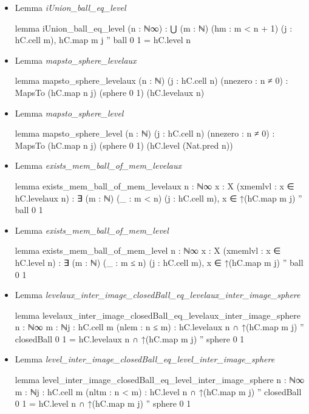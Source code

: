 \documentclass[colorinlistoftodos]{article}
\begin{document}
\begin{itemize}
\begin{leancode}
\end{leancode}
  \item Lemma \emph{iUnion\_ball\_eq\_level}
\begin{leancode}
lemma iUnion_ball_eq_level (n : ℕ∞) :
  ⋃ (m : ℕ) (hm : m < n + 1) (j : hC.cell m), hC.map m j '' ball 0 1 = hC.level n
\end{leancode}
  \item Lemma \emph{mapsto\_sphere\_levelaux}
\begin{leancode}
lemma mapsto_sphere_levelaux (n : ℕ) (j : hC.cell n) (nnezero : n ≠ 0) : 
  MapsTo (hC.map n j) (sphere 0 1) (hC.levelaux  n)
\end{leancode}
  \item Lemma \emph{mapsto\_sphere\_level}
\begin{leancode}
lemma mapsto_sphere_level (n : ℕ) (j : hC.cell n) (nnezero : n ≠ 0) : 
  MapsTo (hC.map n j) (sphere 0 1) (hC.level (Nat.pred n))
\end{leancode}
  \item Lemma \emph{exists\_mem\_ball\_of\_mem\_levelaux}
\begin{leancode}
lemma exists_mem_ball_of_mem_levelaux {n : ℕ∞} {x : X} (xmemlvl : x ∈ hC.levelaux n) : 
  ∃ (m : ℕ) (_ : m < n) (j : hC.cell m), x ∈ ↑(hC.map m j) '' ball 0 1
\end{leancode}
  \item Lemma \emph{exists\_mem\_ball\_of\_mem\_level}
\begin{leancode}
lemma exists_mem_ball_of_mem_level {n : ℕ∞} {x : X} (xmemlvl : x ∈ hC.level n) : 
  ∃ (m : ℕ) (_ : m ≤ n) (j : hC.cell m), x ∈ ↑(hC.map m j) '' ball 0 1
\end{leancode}
  \item Lemma \emph{levelaux\_inter\_image\_closedBall\_eq\_levelaux\_inter\_image\_sphere}
\begin{leancode}
lemma levelaux_inter_image_closedBall_eq_levelaux_inter_image_sphere 
{n : ℕ∞} {m : ℕ}{j : hC.cell m} (nlem : n ≤ m) :
  hC.levelaux n ∩ ↑(hC.map m j) '' closedBall 0 1 = 
  hC.levelaux n ∩ ↑(hC.map m j) '' sphere 0 1
\end{leancode}
  \item Lemma \emph{level\_inter\_image\_closedBall\_eq\_level\_inter\_image\_sphere}
\begin{leancode}
lemma level_inter_image_closedBall_eq_level_inter_image_sphere 
{n : ℕ∞} {m : ℕ}{j : hC.cell m} (nltm : n < m) : 
  hC.level n ∩ ↑(hC.map m j) '' closedBall 0 1 = 
  hC.level n ∩ ↑(hC.map m j) '' sphere 0 1

\end{leancode}
\end{itemize}
\end{document}
